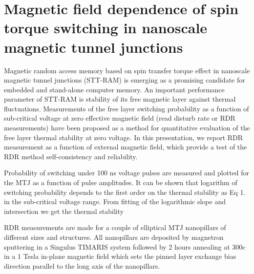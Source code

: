 \chapter{Magnetic field dependence of spin torque switching in nanoscale magnetic tunnel junctions }



Magnetic random access memory based on spin transfer torque effect in nanoscale magnetic tunnel junctions (STT-RAM) is emerging as a promising candidate for embedded and stand-alone computer memory. An important performance parameter of STT-RAM is stability of its free magnetic layer against thermal fluctuations. Measurements of the free layer switching probability as a function of sub-critical voltage at zero effective magnetic field (read disturb rate or RDR measurements) have been proposed as a method for quantitative evaluation of the free layer thermal stability at zero voltage. In this presentation, we report RDR measurement as a function of external magnetic field, which provide a test of the RDR method self-consistency and reliability. 

Probability of switching under 100 ns voltage pulses are measured and plotted for the MTJ as a function of pulse amplitudes. It can be shown that logarithm of switching probability depends to the first order on the thermal stability  as Eq 1. in the sub-critical voltage range. From fitting of the logarithmic slope and intersection we get the thermal stability 



RDR measurements are made for a couple of elliptical MTJ nanopillars of different sizes and structures. All nanopillars are deposited by magnetron sputtering in a Singulus TIMARIS system followed by 2 hours annealing at 300c in a 1 Tesla in-plane magnetic field which sets the pinned layer exchange bias direction parallel to the long axis of the nanopillars.
